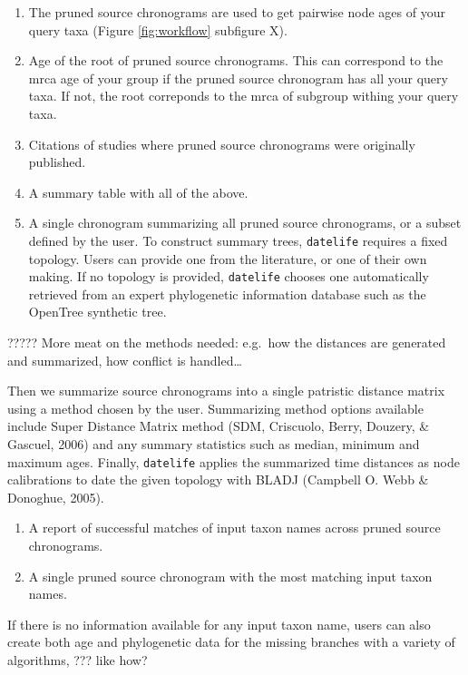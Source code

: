 \documentclass[
  english,
  man]{apa6}
\providecommand{\tightlist}{%
  \setlength{\itemsep}{0pt}\setlength{\parskip}{0pt}}
\begin{document}
\begin{enumerate}
\def\labelenumi{\arabic{enumi}.}
\tightlist
\item
  The pruned source chronograms are used to get pairwise node ages of your query taxa (Figure \ref{fig:workflow} subfigure X).
\item
  Age of the root of pruned source chronograms. This can correspond to the mrca age of your group if the pruned source chronogram has all your query taxa. If not, the root correponds to the mrca of subgroup withing your query taxa.
\item
  Citations of studies where pruned source chronograms were originally published.
\item
  A summary table with all of the above.
\item
  A single chronogram summarizing all pruned source chronograms, or a subset defined by the user.
  To construct summary trees, \texttt{datelife} requires a fixed topology. Users can provide one from the literature, or one of their own making. If no topology is provided, \texttt{datelife} chooses one automatically retrieved from an expert phylogenetic information database such as the OpenTree synthetic tree.
\end{enumerate}

????? More meat on the methods needed: e.g.~how the distances are generated and summarized, how conflict is handled\ldots{}

Then we summarize source chronograms into a single patristic distance matrix using a method chosen by the user. Summarizing method options available include Super Distance Matrix method (SDM, Criscuolo, Berry, Douzery, \& Gascuel, 2006) and any summary statistics such as median, minimum and maximum ages. Finally, \texttt{datelife} applies the summarized time distances as node calibrations to date the given topology with BLADJ (Campbell O. Webb \& Donoghue, 2005).

\begin{enumerate}
\def\labelenumi{\arabic{enumi}.}
\setcounter{enumi}{5}
\tightlist
\item
  A report of successful matches of input taxon names across pruned source chronograms.
\item
  A single pruned source chronogram with the most matching input taxon names.
\end{enumerate}

If there is no information available for any input taxon name, users can also create both age and phylogenetic data for the missing branches with a variety of algorithms, ??? like how?
\end{document}
